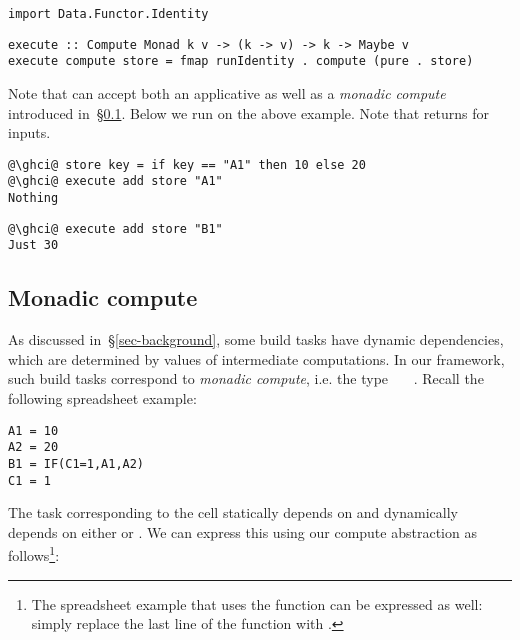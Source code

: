 \vspace{1mm}
\begin{verbatim}
import Data.Functor.Identity
\end{verbatim}
\vspace{0.5mm}
\begin{verbatim}
execute :: Compute Monad k v -> (k -> v) -> k -> Maybe v
execute compute store = fmap runIdentity . compute (pure . store)
\end{verbatim}
\vspace{1mm}

\noindent
Note that  can accept both an applicative as well as a \emph{monadic
compute} introduced in~\S\ref{sec-compute-monad}. Below we run  on
the above  example. Note that  returns  for
inputs.

\vspace{1mm}
\begin{verbatim}
@\ghci@ store key = if key == "A1" then 10 else 20
@\ghci@ execute add store "A1"
Nothing
\end{verbatim}
\begin{verbatim}
@\ghci@ execute add store "B1"
Just 30
\end{verbatim}

\subsection{Monadic compute}\label{sec-compute-monad}

As discussed in~\S\ref{sec-background}, some build tasks have dynamic
dependencies, which are determined by values of intermediate computations. In
our framework, such build tasks correspond to \emph{monadic compute}, i.e.
the type ~~~. Recall the following spreadsheet
example:

\vspace{1mm}
\begin{verbatim}
A1 = 10
A2 = 20
B1 = IF(C1=1,A1,A2)
C1 = 1
\end{verbatim}
\vspace{1mm}

\noindent
The task corresponding to the cell  statically depends on  and
dynamically depends on either  or . We can express this using
our compute abstraction as follows\footnote{The spreadsheet example that uses
the  function can be expressed as well: simply replace the last
line of the  function with .}:

